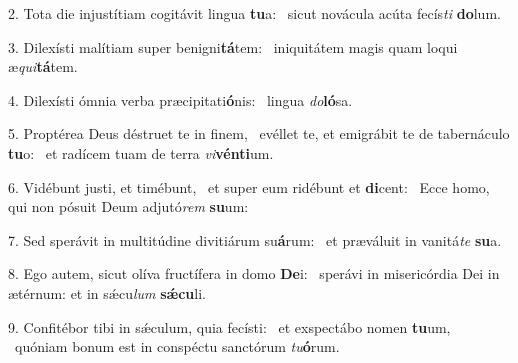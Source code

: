 2. Tota die injustítiam cogitávit lingua \textbf{tu}a: \ast\  sicut novácula acúta fecís\textit{ti} \textbf{do}lum.\

3. Dilexísti malítiam super benigni\textbf{tá}tem: \ast\  iniquitátem magis quam loqui æ\textit{qui}\textbf{tá}tem.\

4. Dilexísti ómnia verba præcipitati\textbf{ó}nis: \ast\  lingua \textit{do}\textbf{ló}sa.\

5. Proptérea Deus déstruet te in finem, \dag\  evéllet te, et emigrábit te de tabernáculo \textbf{tu}o: \ast\  et radícem tuam de terra \textit{vi}\textbf{vén}\textbf{ti}um.\

6. Vidébunt justi, et timébunt, \dag\  et super eum ridébunt et \textbf{di}cent: \ast\  Ecce homo, qui non pósuit Deum adjutó\textit{rem} \textbf{su}um:\

7. Sed sperávit in multitúdine divitiárum su\textbf{á}rum: \ast\  et præváluit in vanitá\textit{te} \textbf{su}a.\

8. Ego autem, sicut olíva fructífera in domo \textbf{De}i: \ast\  sperávi in misericórdia Dei in ætérnum: et in sǽcu\textit{lum} \textbf{sǽ}\textbf{cu}li.\

9. Confitébor tibi in sǽculum, quia fecísti: \dag\  et exspectábo nomen \textbf{tu}um, \ast\  quóniam bonum est in conspéctu sanctórum \textit{tu}\textbf{ó}rum.\

